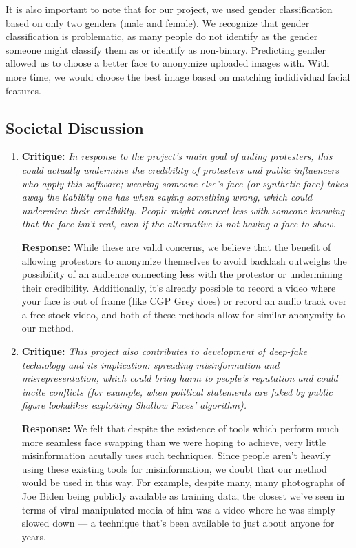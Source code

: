 It is also important to note that for our project, we used gender classification based on only two genders (male and female). We recognize that gender classification is problematic,
as many people do not identify as the gender someone might classify them as or identify as non-binary. Predicting gender allowed us to choose a better face to anonymize uploaded images
with. With more time, we would choose the best image based on matching indidividual facial features.

\subsection{Societal Discussion}

\begin{enumerate}
    \item \textbf{Critique:} \textit{In response to the project’s main goal of aiding protesters, this could actually
    undermine the credibility of protesters and public influencers who apply this
    software; wearing someone else’s face (or synthetic face) takes away the liability
    one has when saying something wrong, which could undermine their credibility.
    People might connect less with someone knowing that the face isn’t real, even if
    the alternative is not having a face to show.}

    \textbf{Response:} While these are valid concerns, we believe that the benefit of allowing protestors to anonymize themselves
    to avoid backlash outweighs the possibility of an audience connecting less with the protestor or undermining their credibility. Additionally, it's already possible to record a video where your face is out of frame (like CGP Grey does) or record an audio track over a free stock video, and both of these methods allow for similar anonymity to our method.

    \item \textbf{Critique:} \textit{This project also contributes to development of deep-fake technology and its implication: spreading misinformation
    and misrepresentation, which could bring harm to people’s reputation and could incite conflicts (for example, when political statements are faked by public figure lookalikes exploiting Shallow Faces’ algorithm).}

    \textbf{Response:} We felt that despite the existence of tools which perform much more seamless face swapping than we were hoping to achieve, very little misinformation acutally uses such techniques. Since people aren't heavily using these existing tools for misinformation, we doubt that our method would be used in this way.
    For example, despite many, many photographs of Joe Biden being publicly available as training data, the closest we've seen in terms of viral manipulated media of him was a video where he was simply slowed down — a technique that's been available to just about anyone for years.


\end{enumerate}
